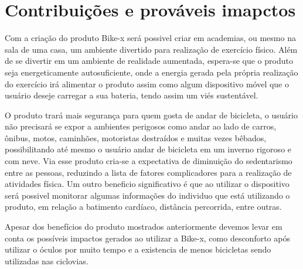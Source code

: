 \chapter*[Impactos]{Contribuições e prováveis imapctos}

Com a criação do produto Bike-x será possivel criar em academias, ou mesmo na sala de uma casa, um ambiente divertido para realização de exercício físico. Além de se divertir em um ambiente de realidade aumentada, espera-se que o produto seja energeticamente autosuficiente, onde a energia gerada pela própria realização do exercício irá alimentar o produto assim como algum dispositivo móvel que o usuário deseje carregar a sua bateria, tendo assim um viés sustentável.  

O produto trará mais segurança para quem gosta de andar de bicicleta, o usuário não precisará se expor a ambientes perigosos como andar ao lado de carros, ônibus, motos, caminhões, motoristas destraídos e muitas vezes bêbados, possibilitando até mesmo o usuário andar de bicicleta em um inverno rigoroso e com neve. Via esse produto cria-se a expectativa de diminuição do sedentarismo entre as pessoas, reduzindo a lista de fatores complicadores para a realização de atividades física. Um outro beneficio significativo é que ao utilizar o dispositivo será possivel monitorar algumas informações do individuo que está utilizando o produto, em relação a batimento cardíaco, distância percorrida, entre outras.

Apesar dos benefícios do produto mostrados anteriormente devemos levar em conta os possíveis impactos gerados ao utilizar a Bike-x, como desconforto após utilizar o óculos por muito tempo e a existencia de menos bicicletas sendo utilizadas nas ciclovias.
